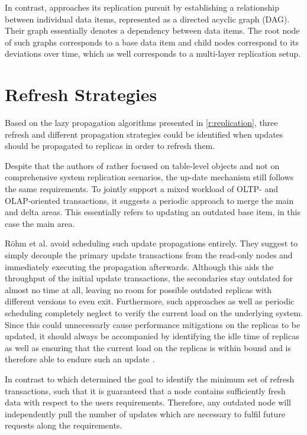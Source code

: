 In contrast, \cite{xiang:2008} approaches its replication pursuit by establishing a relationship between individual data items, represented as a directed acyclic graph (DAG).
Their graph essentially denotes a dependency between data items. The root node of such graphs corresponds to a base data item and child nodes correspond 
to its deviations over time, which as well corresponds to a multi-layer replication setup.





\section{Refresh Strategies}
\label{r:strategies}
Based on the lazy propagation algorithms presented in \ref{r:replication}, three refresh and different propagation strategies could be identified when updates should be propagated 
to replicas in order to refresh them.

Despite that the authors of \cite{psaroudakis:2015} rather focused on table-level objects and not on comprehensive system replication scenarios, the up-date mechanism 
still follows the same requirements. To jointly support a mixed workload of OLTP- and OLAP-oriented transactions,
it suggests a periodic approach to merge the main and delta areas. This essentially refers to updating an outdated base item, in this case the main area.

Röhm et al. \cite{rohm:2002} avoid scheduling such update propagations entirely. They suggest to simply decouple the primary update transactions from the read-only nodes
and immediately executing the propagation afterwards. Although this aids the throughput of the initial update transactions, the secondaries 
stay outdated for almost no time at all, leaving no room for possible outdated replicas with different versions to even exit. 
Furthermore, such approaches as well as periodic scheduling completely neglect to verify the current load on the underlying system.
Since this could unnecessarly cause performance mitigations on the replicas to be updated, it should always be accompanied by identifying the idle time of replicas as well 
as ensuring that the current load on the replicas is within bound and is therefore able to endure such an update \cite{voicu:2010}.

In contrast to \cite{peralta:2006} which determined the goal to identify the minimum set of refresh transactions, such that it is guaranteed that a node contains 
sufficiently fresh data with respect to the users requirements. Therefore, any outdated node will independently pull the number of updates which are necessary to 
fulfil future requests along the requirements.

